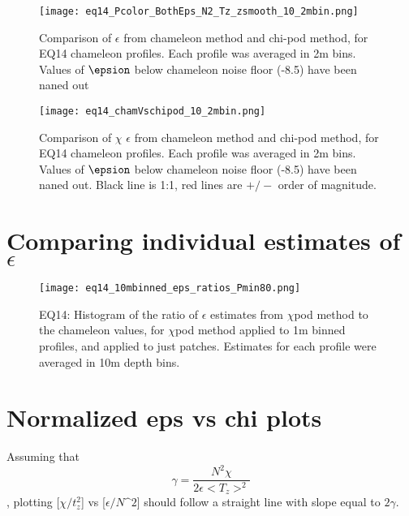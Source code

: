 \documentclass[11pt]{article}
\begin{document}
\begin{figure}[htbp]
\texttt{[image: eq14\_Pcolor\_BothEps\_N2\_Tz\_zsmooth\_10\_2mbin.png]}
\caption{Comparison of $\epsilon$ from chameleon method and chi-pod method, for EQ14 chameleon profiles. Each profile was averaged in 2m bins.  Values of $\epsion$ below chameleon noise floor (-8.5) have been naned out}
\label{eps_overview}
\end{figure}



\begin{figure}[htbp]
\texttt{[image: eq14\_chamVschipod\_10\_2mbin.png]}
\caption{Comparison of $\chi$ $\epsilon$ from chameleon method and chi-pod method, for EQ14 chameleon profiles. Each profile was averaged in 2m bins.  Values of $\epsion$ below chameleon noise floor (-8.5) have been naned out. Black line is 1:1, red lines are $+/-$ order of magnitude.}
\label{chamVschi}
\end{figure}




\clearpage
\section{Comparing individual estimates of $\epsilon$}

\begin{figure}[htbp]
\texttt{[image: eq14\_10mbinned\_eps\_ratios\_Pmin80.png]}
\caption{EQ14: Histogram of the ratio of $\epsilon$ estimates from $\chi$pod method to the chameleon values, for $\chi$pod method applied to 1m binned profiles, and applied to just patches. Estimates for each profile were averaged in 10m depth bins.}
\label{epsrathist_eq14}
\end{figure}




\clearpage
\section{Normalized eps vs chi plots}

Assuming that
\begin{equation}
\gamma=\frac{N^2 \chi}{2\epsilon<T_z>^2}
\end{equation}
, plotting [$\chi/t_{z}^{2}$] vs [$\epsilon/N\^2$] should follow a straight line with slope equal to $2\gamma$.
\end{document}

